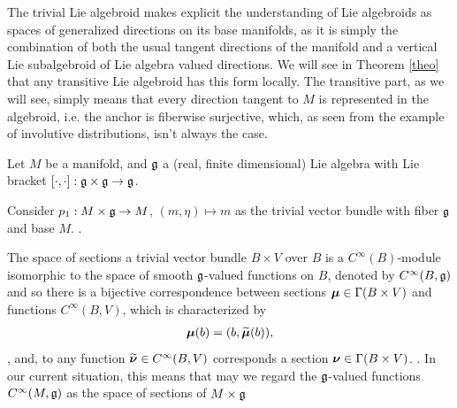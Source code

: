 The trivial Lie algebroid makes explicit the understanding of Lie algebroids as spaces of generalized directions on its base manifolds, as it is simply the combination of both the usual tangent directions of the manifold and a vertical Lie subalgebroid of Lie algebra valued directions. We will see in Theorem \ref{theo} that any transitive Lie algebroid has this form locally. The transitive part, as we will see, simply means that every direction tangent to $M$ is represented in the algebroid, i.e. the anchor is fiberwise surjective, which, as seen from the example of involutive distributions, isn't always the case.

Let $M$ be a manifold, and $\mathfrak{g}$ a (real, finite dimensional) Lie algebra with Lie bracket $[\cdot , \cdot]: \mathfrak{g} \times \mathfrak{g} \to \mathfrak{g}$.

Consider $p_1: M \times \mathfrak{g} \to M$, $(m, \eta) \mapsto m$ as the trivial vector bundle with fiber $\mathfrak{g}$ and base $M$. . %

The space of sections a trivial vector bundle $B \times V$ over $B$ is a $C^\infty(B)$-module isomorphic to the space of smooth $\mathfrak{g}$-valued functions on $B$, denoted by \emph{$C^\infty(B, \mathfrak{g})$} and so 
there is a bijective correspondence between sections $\bm{\mu} \in \Gamma(B \times V)$ and functions $C^\infty(B, V)$, which is characterized by
\begin{align} \label{defnTildeSect}
    \bm{\mu}(b) = (b, \widetilde{\bm{\mu}}(b)),
\end{align}, and, to any function $\widetilde{\bm{\nu}} \in C^\infty(B, V)$ corresponds a section $\bm{\nu} \in \Gamma(B \times V)$. . In our current situation, this means that may we regard the $\mathfrak{g}$-valued functions $C^\infty(M, \mathfrak{g})$ as the space of sections of $M \times \mathfrak{g}$

